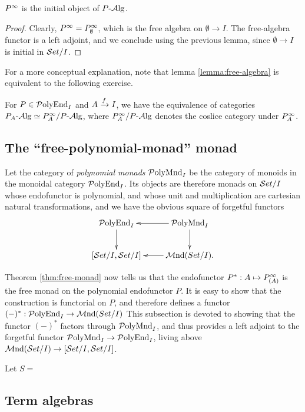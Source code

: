 \begin{corollary}
    $P^\moo$ is the initial object of $P\alg$.
\end{corollary}
\begin{proof}
    Clearly, $P^\moo=P_\emptyset^\moo$, which is the free algebra on
    $\emptyset\to I$. The free-algebra functor is a left adjoint, and we
    conclude using the previous lemma, since $\emptyset\to I$ is initial in
    $\Set/I$.
\end{proof}


For a more conceptual explanation, note that lemma \ref{lemma:free-algebra} is
equivalent to the following exercise.
\begin{exercise}
    For $P\in\PolyEnd_I$ and $A\xto{f} I$, we have the equivalence of categories
    $P_A\alg\simeq P_A^\moo/P\alg$, where $P_A^\moo/P\alg$ denotes the coslice
    category under $P_A^\moo$.
\end{exercise}

\subsection{The ``free-polynomial-monad'' monad}
Let the category of \emph{polynomial monads} $\PolyMnd_I$ be the category of
monoids in the monoidal category $\PolyEnd_I$. Its objects are therefore monads
on $\Set/I$ whose endofunctor is polynomial, and whose unit and multiplication
are cartesian natural transformations, and we have the obvious square of
forgetful functors
\[
    \xymatrix{
      \PolyEnd_I\ar[d]
      &\PolyMnd_I\ar[l]\ar[d]\\
      [\Set/I,\Set/I]
      &\Mnd(Set/I).\ar[l]
    }
\]

Theorem \ref{thm:free-monad} now tells us that the endofunctor
$P^*:A\mapsto P_{(A)}^\moo$ is the free monad on the polynomial endofunctor $P$.
It is easy to show that the construction is functorial on $P$, and therefore
defines a functor $(-)^*:\PolyEnd_I\to\Mnd(Set/I)$
This subsection is devoted to showing that the functor $(-)^*$ factors through
$\PolyMnd_I$, and thus provides a left adjoint to the forgetful functor
$\PolyMnd_I\to\PolyEnd_I$, living above $\Mnd(\Set/I)\to[\Set/I,\Set/I]$. 

\begin{lemma}
    Let $S=$
\end{lemma}

\subsection{Term algebras}


